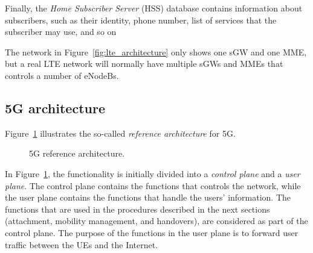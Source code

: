 Finally, the \emph{Home Subscriber Server} (HSS) database contains information about subscribers, such as their identity, phone number, list of services that the subscriber may use, and so on

The network in Figure~\ref{fig:lte_architecture} only shows one sGW and one MME, but a real LTE network will normally have multiple sGWs and MMEs that controls a number of eNodeBs.

\subsection{5G architecture}
Figure~\ref{fig:5grefarch} illustrates the so-called \emph{reference architecture} for 5G.
\begin{figure}[htbp]
\centering
{}
\caption{\label{fig:5grefarch}5G reference architecture.}
\end{figure}

In Figure~\ref{fig:5grefarch}, the functionality is initially divided into a \emph{control plane} and a \emph{user plane}. The control plane contains the functions that controls the network, while the user plane contains the functions that handle the users' information. The functions that are used in  the procedures described in the next sections (attachment, mobility management, and handovers), are considered as part of the control plane. The purpose of the functions in the user plane is to forward user traffic between the UEs and the Internet.

